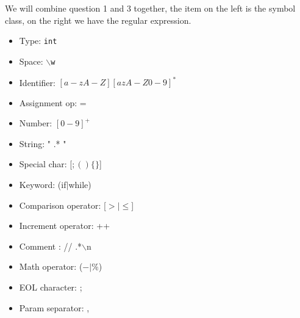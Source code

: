 
    We will combine question 1 and 3 together, the item on the left is the symbol class, on the right we have the regular expression.
\begin{itemize}
    \item Type: \texttt{int} 
    \item Space: \texttt{$\backslash$w } 
    \item Identifier: \texttt{$[a-zA-Z][azA-Z0-9]^{*}$}
    \item Assignment op: =
    \item Number: $[0-9]^{+}$
    \item String: " .* "
    \item Special char: [$;()\{\}$]
    \item Keyword: (if$|$while)
    \item Comparison operator: [$>|\le$]
    \item Increment operator: ++
    \item Comment : // .*$\backslash$n
    \item Math operator: ($-|\%$)
    \item EOL character: ;
    \item Param separator: ,
\end{itemize}